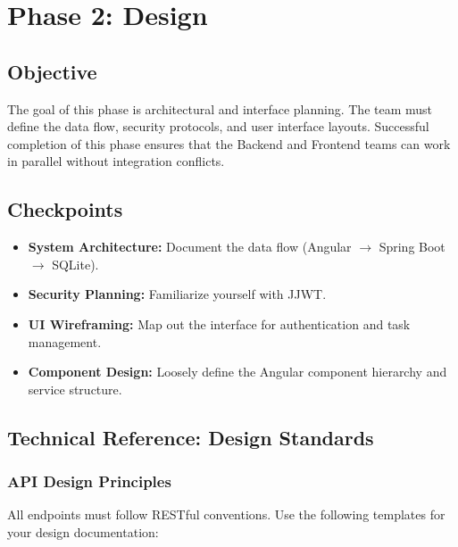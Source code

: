 

\section{Phase 2: Design}\label{sec:phase2}

\subsection{Objective}
The goal of this phase is architectural and interface planning. The team must define the data flow,
security protocols, and user interface layouts. Successful completion of this phase ensures that
the Backend and Frontend teams can work in parallel without integration conflicts.

\subsection{Checkpoints}
\begin{itemize}
  \item[$\square$] \textbf{System Architecture:} Document the data flow (Angular $\rightarrow$ Spring Boot $\rightarrow$ SQLite).
  \item[$\square$] \textbf{Security Planning:} Familiarize yourself with JJWT.
  \item[$\square$] \textbf{UI Wireframing:} Map out the interface for authentication and task management.
  \item[$\square$] \textbf{Component Design:} Loosely define the Angular component hierarchy and service structure.
\end{itemize}

\subsection{Technical Reference: Design Standards}

\subsubsection{API Design Principles}
All endpoints must follow RESTful conventions. Use the following templates for your design documentation:

